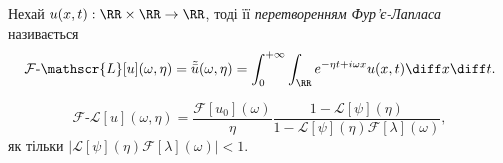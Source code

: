 \begin{definition}
    Нехай $u(x, t): \RR \times \RR \to \RR$, тоді її \textit{перетворенням Фур'є-Лапласа} називається 
    \begin{equation}
        \mathcal{F}\text{-}\mathscr{L}[u](\omega, \eta) = \tilde{\bar{u}}(\omega, \eta) = \int_0^{+\infty} \int_\RR e^{-\eta t + i \omega x} u(x, t) \diff x \diff t.
    \end{equation}
\end{definition}

\begin{th_formula}
    \begin{equation}
        \mathcal{F}\text{-}\mathscr{L}[u](\omega, \eta) = \frac{\mathcal{F}[u_0](\omega)}{\eta} \frac{1 - \mathscr{L}[\psi](\eta)}{1 - \mathscr{L}[\psi](\eta) \mathcal{F}[\lambda](\omega)},
    \end{equation}
    як тільки $|\mathscr{L}[\psi](\eta) \mathcal{F}[\lambda](\omega)| < 1$.
\end{th_formula}
